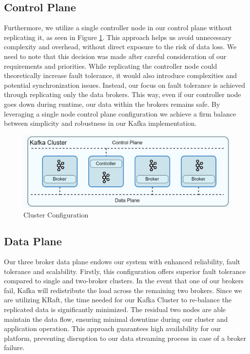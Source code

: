 \subsection{Control Plane}

Furthermore, we utilize a single controller node in our control plane without replicating it, as seen in Figure \ref{ClusterConfiguration}. This approach helps us avoid unnecessary complexity and overhead, without direct exposure to the risk of data loss. We need to note that this decision was made after careful consideration of our requirements and priorities. While replicating the controller node could theoretically increase fault tolerance, it would also introduce complexities and potential synchronization issues. Instead, our focus on fault tolerance is achieved through replicating only the data brokers. This way, even if our controller node goes down during runtime, our data within the brokers remains safe. By leveraging a single node control plane configuration we achieve a firm balance between simplicity and robustness in our Kafka implementation.

\begin{figure}[htbp]
	\includegraphics[width=0.75\linewidth]{figures/cluster.drawio.png}
	\centering
	\caption{Cluster Configuration}
	\label{ClusterConfiguration}
\end{figure}

\subsection{Data Plane}
Our three broker data plane endows our system with enhanced reliability, fault tolerance and scalability. Firstly, this configuration offers superior fault tolerance compared to single and two-broker clusters. In the event that one of our brokers fail, Kafka will redistribute the load across the remaining two brokers. Since we are utilizing KRaft, the time needed for our Kafka Cluster to re-balance the replicated data is significantly minimized. The residual two nodes are able maintain the data flow, ensuring minimal downtime during our cluster and application operation. This approach guarantees high availability for our platform, preventing disruption to our data streaming process in case of a broker failure.

